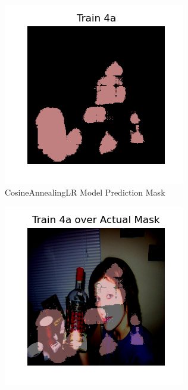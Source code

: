 \documentclass{article}
\begin{document}
\begin{figure}[h!]
  \centering
  \begin{subfigure}[b]{0.45\textwidth}
      \centering
      \includegraphics[width=\textwidth]{include/plots/train_4_a_pred.png}
      \caption{CosineAnnealingLR Model Prediction Mask}
      \label{fig:cosine_msk}
  \end{subfigure}
  \hfill %
  \begin{subfigure}[b]{0.45\textwidth}
      \centering
      \includegraphics[width=\textwidth]{include/plots/train_4_a_over_actual.png} %

\end{subfigure}
\end{figure}
\end{document}
